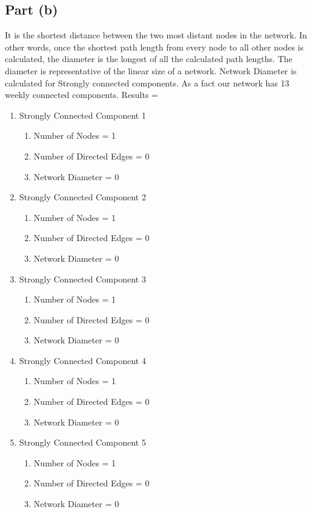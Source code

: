 \documentclass[conference]{IEEEtran}
\begin{document}
\subsection{Part (b)}
It is the shortest distance between the two most distant nodes in the network. In other words, once the shortest path length from every node to all other nodes is calculated, the diameter is the longest of all the calculated path lengths. The diameter is representative of the linear size of a network.
Network Diameter is calculated for Strongly connected components. As a fact our network has 13 weekly connected components.
Results = 
\begin{enumerate}
\item Strongly Connected Component 1
\begin{enumerate}
\item Number of Nodes = 1
\item Number of Directed Edges = 0
\item Network Diameter = 0
\end{enumerate}
\item Strongly Connected Component 2
\begin{enumerate}
\item Number of Nodes = 1
\item Number of Directed Edges = 0
\item Network Diameter = 0
\end{enumerate}
\item Strongly Connected Component 3
\begin{enumerate}
\item Number of Nodes = 1
\item Number of Directed Edges = 0
\item Network Diameter = 0
\end{enumerate}
\item Strongly Connected Component 4
\begin{enumerate}
\item Number of Nodes = 1
\item Number of Directed Edges = 0
\item Network Diameter = 0
\end{enumerate}
\item Strongly Connected Component 5
\begin{enumerate}
\item Number of Nodes = 1
\item Number of Directed Edges = 0
\item Network Diameter = 0

\end{enumerate}
\end{enumerate}
\end{document}
